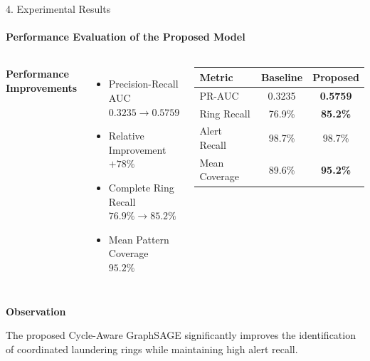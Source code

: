 \documentclass[aspectratio=169,11pt]{beamer}
\begin{document}
\begin{frame}{4. Experimental Results}

\framesubtitle{Performance Evaluation of the Proposed Model}

\begin{columns}[T]


{\footnotesize
\textbf{Performance Improvements}

\begin{itemize}\setlength{\itemsep}{3.5pt}\setlength{\parskip}{0pt}

\item Precision-Recall AUC\\[1pt]
$0.3235 \rightarrow 0.5759$

\item Relative Improvement\\[1pt]
$+78\%$

\item Complete Ring Recall\\[1pt]
$76.9\% \rightarrow 85.2\%$

\item Mean Pattern Coverage\\[1pt]
$95.2\%$

\end{itemize}
}


\centering

\renewcommand{\arraystretch}{1.12}
\small

\begin{tabular}{lcc}
\toprule
Metric & Baseline & Proposed\\
\midrule
PR-AUC & 0.3235 & \textbf{0.5759}\\
Ring Recall & 76.9\% & \textbf{85.2\%}\\
Alert Recall & 98.7\% & 98.7\%\\
Mean Coverage & 89.6\% & \textbf{95.2\%}\\
\bottomrule
\end{tabular}

\end{columns}

\vspace{0.18cm}

{\footnotesize
\textbf{Observation}

The proposed Cycle-Aware GraphSAGE significantly improves the identification of coordinated laundering rings while maintaining high alert recall.
}

\end{frame}
\end{document}

